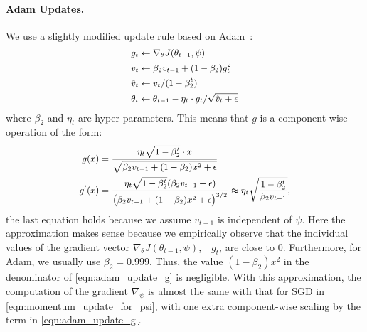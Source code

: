 \paragraph{Adam Updates.} We use a slightly modified update rule based on Adam~\citep{adam}:
\begin{equation}
  \label{eqn:adam_update}
   \small
  \begin{aligned}
    &g_t \leftarrow \nabla_\theta J(\theta_{t-1}, \psi) \\
    &v_t \leftarrow \beta_2 v_{t-1} + (1 - \beta_2) g_t^2 \\
    &\hat{v}_t \leftarrow v_t / (1 - \beta_2^t) \\
    &\theta_t \leftarrow \theta_{t-1} - \eta_t \cdot g_t / \sqrt{\hat{v}_t + \epsilon}
  \end{aligned}
\end{equation}
where $\beta_2$ and $\eta_t$ are hyper-parameters. This means that $g$ is a component-wise operation of the form:
\begin{equation}
  \label{eqn:adam_update_g}
   \small
  \begin{aligned}
    g(x) &= \frac{\eta_t \sqrt{1 - \beta_2^t} \cdot x}{\sqrt{\beta_2 v_{t-1} + (1 - \beta_2) x^2 + \epsilon}} \\
    g'(x) &= \frac{\eta_t \sqrt{1 - \beta_2^t} (\beta_2 v_{t-1} + \epsilon)}{\big( \beta_2 v_{t-1} + (1 - \beta_2) x^2 + \epsilon \big)^{3/2}} \approx \eta_t \sqrt{\frac{1 - \beta_2^t}{\beta_2 v_{t-1}}},  
  \end{aligned}
\end{equation}
the last equation holds because we assume $v_{t-1}$ is independent of $\psi$. Here the approximation makes sense because we empirically observe that the individual values of the gradient vector $\nabla_\theta J(\theta_{t-1}, \psi)$,~\ie~$g_t$, are close to $0$. Furthermore, for Adam, we usually use $\beta_2 = 0.999$. Thus, the value $(1 - \beta_2) x^2$ in the denominator of \autoref{eqn:adam_update_g} is negligible. With this approximation, the computation of the gradient $\nabla_\psi$ is almost the same with that for SGD in \autoref{eqn:momentum_update_for_psi}, with one extra component-wise scaling by the term in \autoref{eqn:adam_update_g}.

